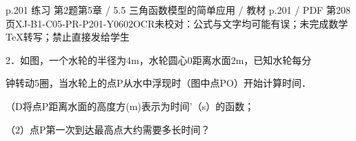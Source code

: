\begin{bankitem}{p.201 练习 第2题}{第5章 / 5.5 三角函数模型的简单应用 / 教材 p.201 / PDF 第208页}{XJ-B1-C05-PR-P201-Y0602}{OCR未校对：公式与文字均可能有误；未完成数学TeX转写；禁止直接发给学生}
\begin{ocrdraft}
\par
2．如图，一个水轮的半径为4m，水轮圆心0距离水面2m，已知水轮每分
\par
钟转动5圈，当水轮上的点P从水中浮现时（图中点PO）开始计算时间．
\par
（D将点P距离水面的高度方(m)表示为时间'（s）的函数；
\par
（2）点P第一次到达最高点大约需要多长时间？
\end{ocrdraft}
\end{bankitem}
